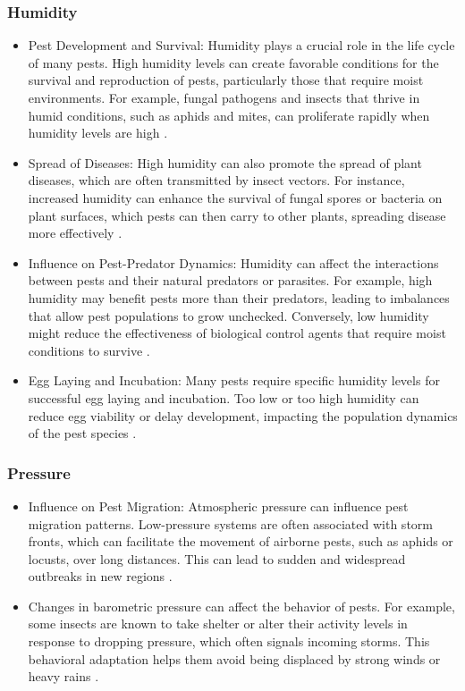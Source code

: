 \subsubsection{Humidity}
        \begin{itemize}
        \item Pest Development and Survival: Humidity plays a crucial role in the life cycle of many pests. High humidity levels can create favorable conditions for the survival and reproduction of pests, particularly those that require moist environments. For example, fungal pathogens and insects that thrive in humid conditions, such as aphids and mites, can proliferate rapidly when humidity levels are high  \cite{climate2}.
        \item  Spread of Diseases: High humidity can also promote the spread of plant diseases, which are often transmitted by insect vectors. For instance, increased humidity can enhance the survival of fungal spores or bacteria on plant surfaces, which pests can then carry to other plants, spreading disease more effectively \cite{climate2}.
        \item Influence on Pest-Predator Dynamics: Humidity can affect the interactions between pests and their natural predators or parasites. For example, high humidity may benefit pests more than their predators, leading to imbalances that allow pest populations to grow unchecked. Conversely, low humidity might reduce the effectiveness of biological control agents that require moist conditions to survive \cite{climate2}.
        \item Egg Laying and Incubation: Many pests require specific humidity levels for successful egg laying and incubation. Too low or too high humidity can reduce egg viability or delay development, impacting the population dynamics of the pest species \cite{climate2}.
        \end{itemize}
\subsubsection{Pressure}
        \begin{itemize}
        \item Influence on Pest Migration: Atmospheric pressure can influence pest migration patterns. Low-pressure systems are often associated with storm fronts, which can facilitate the movement of airborne pests, such as aphids or locusts, over long distances. This can lead to sudden and widespread outbreaks in new regions \cite{climate3}.
        \item  Changes in barometric pressure can affect the behavior of pests. For example, some insects are known to take shelter or alter their activity levels in response to dropping pressure, which often signals incoming storms. This behavioral adaptation helps them avoid being displaced by strong winds or heavy rains \cite{climate2}.
        \end{itemize}
